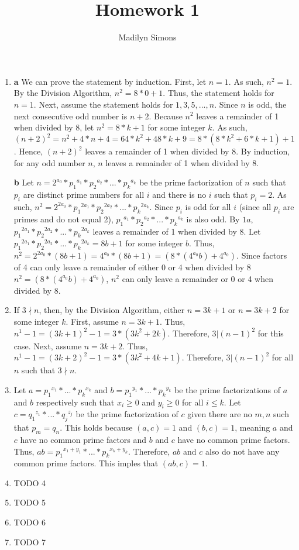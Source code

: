 \documentclass{article}
\title{Homework 1}
\author{Madilyn Simons}
\date{}
\begin{document}
\maketitle

\begin{enumerate}

\item \textbf{a} We can prove the statement by induction.  First, let $n = 1$.  As such, $n^2 = 1$.  By the Division Algorithm, $n^2 = 8*0 + 1$.  Thus, the statement holds for $n = 1$.  Next, assume the statement holds for $1, 3, 5, ..., n$.  Since $n$ is odd, the next consecutive odd number is $n+2$.  Because $n^2$ leaves a remainder of 1 when divided by 8, let $n^2 = 8*k + 1$ for some integer $k$.  As such, $(n+2)^2 = n^2 + 4*n + 4 = 64*k^2 + 48*k + 9 = 8 * (8*k^2 + 6*k + 1) + 1$.  Hence, $(n+2)^2$ leaves a remainder of 1 when divided by 8.  By induction, for any odd number $n$, $n$ leaves a remainder of 1 when divided by 8.

\textbf{b} Let $n = 2^{a_0} * {p_1}^{a_1} * {p_2}^{a_2} * ... * {p_k}^{a_k}$ be the prime factorization of $n$ such that $p_i$ are distinct prime numbers for all $i$ and there is no $i$ such that $p_i = 2$.  As such, $n^2 = 2^{2a_0} * {p_1}^{2a_1} * {p_2}^{2a_2} * ... * {p_k}^{2a_k}$.  Since $p_i$ is odd for all $i$ (since all $p_i$ are primes and do not equal 2), ${p_1}^{a_1} * {p_2}^{a_2} * ... * {p_k}^{a_k}$ is also odd.  By $1a$, ${p_1}^{2a_1} * {p_2}^{2a_2} * ... * {p_k}^{2a_k}$ leaves a remainder of 1 when divided by 8.  Let ${p_1}^{2a_1} * {p_2}^{2a_2} * ... * {p_k}^{2a_k} = 8b + 1$ for some integer $b$.  Thus, $n^2 = 2^{2a_0} * (8b + 1) = 4^{a_0} * (8b + 1) = (8 * (4^{a_0}b) + 4^{a_0}).$  Since factors of 4 can only leave a remainder of either 0 or 4 when divided by 8 $n^2 = (8 * (4^{a_0}b) + 4^{a_0})$, $n^2$ can only leave a remainder or 0 or 4 when divided by 8.

\item If $3 \nmid n$, then, by the Division Algorithm, either $n = 3k + 1$ or $n = 3k + 2$ for some integer $k$.  First, assume $n = 3k + 1$.  Thus, $n^1 - 1 = (3k + 1)^2 - 1 = 3 * (3k^2 + 2k)$.  Therefore, $3 \vert (n - 1)^2$ for this case.  Next, assume $n = 3k + 2$.  Thus, $n^1 - 1 = (3k + 2)^2 - 1 = 3 * (3k^2 + 4k + 1)$.  Therefore, $3 \vert (n - 1)^2$ for all $n$ such that $3 \nmid n$.

\item Let $a = {p_1}^{x_1} * ... * {p_k}^{x_k}$ and $b = {p_1}^{y_1} * ... * {p_k}^{y_k}$ be the prime factorizations of $a$ and $b$ respectively such that $x_i \geq 0$ and $y_i \geq 0$ for all $i \leq k$.  Let $c = {q_1}^{z_1} * ... * {q_j}^{z_j}$ be the prime factorization of $c$ given there are no $m, n$ such that $p_m = q_n$.  This holds because $(a, c) = 1$ and $(b, c) = 1$, meaning $a$ and $c$ have no common prime factors and $b$ and $c$ have no common prime factors.  Thus, $ab = {p_1}^{x_1 + y_1} * ... * {p_k}^{x_k + y_k}$.  Therefore, $ab$ and $c$ also do not have any common prime factors.  This imples that $(ab, c) = 1$.

\item TODO 4

\item TODO 5

\item TODO 6

\item TODO 7

\end{enumerate}
\end{document}
